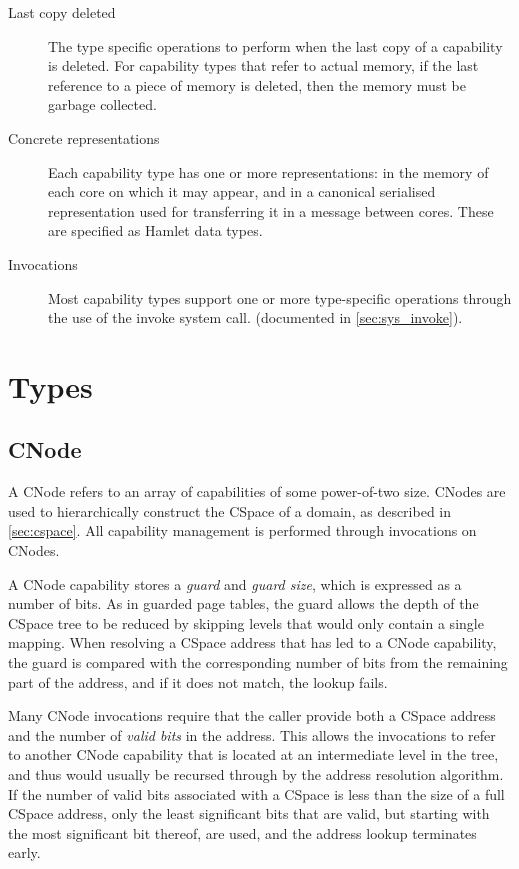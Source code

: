 \begin{description}
\item[Last copy deleted] The type specific operations to perform when
  the last copy of a capability is deleted. For capability types
    that refer to actual memory, if the last reference to a piece of
    memory is deleted, then the memory must be garbage collected.

\item[Concrete representations] Each capability type has one or more
  representations: in the memory of each core on which it may appear,
  and in a canonical serialised representation used for transferring
  it in a message between cores. These are specified as
  Hamlet\cite{hamlet} data types.

\item[Invocations] Most capability types support one or more
  type-specific operations through the use of the invoke system call.
  (documented in \ref{sec:sys_invoke}).
\end{description}

\section{Types}
  
\subsection{CNode}\label{sec:cnode}

A CNode refers to an array of capabilities of some power-of-two size.
CNodes are used to hierarchically construct the CSpace of a domain, as
described in \ref{sec:cspace}.  All capability management is
performed through invocations on CNodes.

A CNode capability stores a \emph{guard} and \emph{guard size}, which
is expressed as a number of bits. As in guarded page
tables\cite{Liedtke_GPT}, the guard allows the depth of the CSpace
tree to be reduced by skipping levels that would only contain a single
mapping. When resolving a CSpace address that has led to a CNode
capability, the guard is compared with the corresponding number of
bits from the remaining part of the address, and if it does not match,
the lookup fails.

Many CNode invocations require that the caller provide both a CSpace
address and the number of \emph{valid bits} in the address. This
allows the invocations to refer to another CNode capability that is
located at an intermediate level in the tree, and thus would usually
be recursed through by the address resolution algorithm. If the number
of valid bits associated with a CSpace is less than the size of a full
CSpace address, only the least significant bits that are valid, but
starting with the most significant bit thereof, are used, and the
address lookup terminates early.


